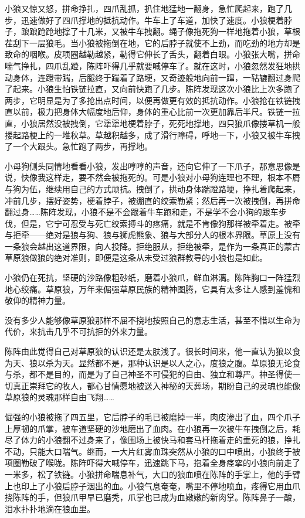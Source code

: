 \par 小狼又惊又怒，拼命挣扎，四爪乱抓，扒住地猛地一翻身，急忙爬起来，跑了几步，迅速做好了四爪撑地的抵抗动作。牛车上了车道，加快了速度。小狼梗着脖子，踉踉跄跄地撑了十几米，又被牛车拽翻。绳子像拖死狗一样地拖着小狼，草根茬刮下一层狼毛。当小狼被拖倒在地，它的后脖子就使不上劲，而吃劲的地方却是致命的咽喉。皮项圈越勒越紧，勒得它伸长了舌头，翻着白眼。小狼张大嘴，拼命喘气挣扎，四爪乱蹬，陈阵吓得几乎就要喊停车了。就在这时，小狼忽然发狂地拱动身体，连蹬带踹，后腿终于踹着了路埂，又奇迹般地向前一蹿，一轱辘翻过身爬了起来。小狼生怕铁链拉直，又向前快跑了几步。陈阵发现这次小狼比上次多跑了两步，它明显是为了多抢出点时间，以便再做更有效的抵抗动作。小狼抢在铁链拽直以前，极力把身体大幅度地后仰，身体的重心比前一次更加靠后半尺。铁链一拉直，小狼居然没被拽倒，它犟犟地梗着脖子，死死地撑地，四只狼爪像搂草机一般搂起路梗上的一堆秋草。草越积越多，成了滑行障碍，呼地一下，小狼又被牛车拽了一个大跟头。急忙跑了两步，再撑地。
\par 小母狗侧头同情地看看小狼，发出哼哼的声音，还向它伸了一下爪子，那意思像是说，快像我这样走，要不然会被拖死的。可是小狼对小母狗连理也不理，根本不屑与狗为伍，继续用自己的方式顽抗。拽倒了，拱动身体踹蹬路埂，挣扎着爬起来，冲前几步，摆好姿势，梗着脖子，被绷直的绞索勒紧；然后再一次被拽倒，再拼命翻过身……陈阵发现，小狼不是不会跟着牛车跑和走，不是学不会小狗的跟车步伐，但是，它宁可忍受与死亡绞索搏斗的疼痛，就是不肯像狗那样被牵着走。被牵与拒牵——绝对是狼与狗、狼与狮虎熊象、狼与大部分人的根本界限。草原上没有一条狼会越出这道界限，向人投降。拒绝服从，拒绝被牵，是作为一条真正的蒙古草原狼做狼的绝对准则，即便是这条从未受过狼群教导的小狼也是如此。
\par 小狼仍在死抗，坚硬的沙路像粗砂纸，磨着小狼爪，鲜血淋漓。陈阵胸口一阵猛烈地心绞痛。草原狼，万年来倔强草原民族的精神图腾，它具有太多让人感到羞愧和敬仰的精神力量。
\par 没有多少人能够像草原狼那样不屈不挠地按照自己的意志生活，甚至不惜以生命为代价，来抗击几乎不可抗拒的外来力量。
\par 陈阵由此觉得自己对草原狼的认识还是太肤浅了。很长时间来，他一直认为狼以食为天、狼以杀为天。显然都不是，那种认识是以人之心，度狼之腹。草原狼无论食与杀，都不是目的，而是为了自己神圣不可侵犯的自由、独立和尊严。神圣得使一切真正崇拜它的牧人，都心甘情愿地被送入神秘的天葬场，期盼自己的灵魂也能像草原狼的灵魂那样自由飞翔……
\par 倔强的小狼被拖了四五里，它后脖子的毛已被磨掉一半，肉皮渗出了血，四个爪子上厚韧的爪掌，被车道坚硬的沙地磨出了血肉。在小狼再一次被牛车拽倒之后，耗尽了体力的小狼翻不过身来了，像围场上被快马和套马杆拖着走的垂死的狼，挣扎不动，只能大口喘气。继而，一大片红雾血珠突然从小狼的口中喷出，小狼终于被项圈勒破了喉咙。陈阵吓得大喊停车，迅速跳下马，抱着全身痉挛的小狼向前走了一米多，松了铁链。小狼拼命喘息补气，大口的狼血喷在陈阵的手掌上，他的手臂上也印上了小狼后脖子洇出的血。小狼气息奄奄，嘴里不停地喷血，疼得它用血爪挠陈阵的手，但狼爪甲早已磨秃，爪掌也已成为血嫩嫩的新肉掌。陈阵鼻子一酸，泪水扑扑地滴在狼血里。
